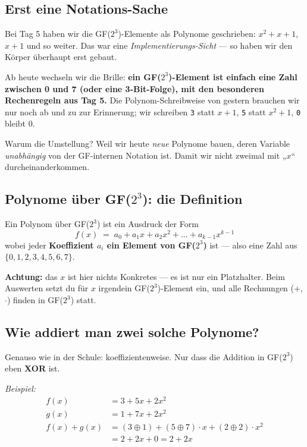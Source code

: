 \subsection*{Erst eine Notations-Sache}

Bei Tag 5 haben wir die GF($2^3$)-Elemente als Polynome geschrieben:
$x^2 + x + 1$, $x + 1$ und so weiter. Das war eine \emph{Implementierungs-Sicht}
— so haben wir den Körper überhaupt erst gebaut.

Ab heute wechseln wir die Brille: \textbf{ein GF($2^3$)-Element ist
einfach eine Zahl zwischen 0 und 7 (oder eine 3-Bit-Folge), mit den
besonderen Rechenregeln aus Tag 5.} Die Polynom-Schreibweise von
gestern brauchen wir nur noch ab und zu zur Erinnerung; wir schreiben
\texttt{3} statt $x+1$, \texttt{5} statt $x^2+1$, \texttt{0} bleibt $0$.

Warum die Umstellung? Weil wir heute \emph{neue} Polynome bauen, deren
Variable \emph{unabhängig} von der GF-internen Notation ist. Damit wir
nicht zweimal mit „$x$“ durcheinanderkommen.

\subsection*{Polynome über GF($2^3$): die Definition}

Ein Polynom über GF($2^3$) ist ein Ausdruck der Form
\[
  f(x) \;=\; a_0 + a_1 x + a_2 x^2 + \dots + a_{k-1} x^{k-1}
\]
wobei jeder \textbf{Koeffizient $a_i$ ein Element von GF($2^3$)} ist
— also eine Zahl aus $\{0, 1, 2, 3, 4, 5, 6, 7\}$.

\textbf{Achtung:} das $x$ ist hier nichts Konkretes — es ist nur ein
Platzhalter. Beim Auswerten setzt du für $x$ irgendein
GF($2^3$)-Element ein, und alle Rechnungen ($+$, $\cdot$) finden in
GF($2^3$) statt.

\subsection*{Wie addiert man zwei solche Polynome?}

Genauso wie in der Schule: koeffizientenweise. Nur dass die Addition
in GF($2^3$) eben \textbf{XOR} ist.

\textit{Beispiel:}
\begin{align*}
  f(x) &= 3 + 5x + 2x^2 \\
  g(x) &= 1 + 7x + 2x^2 \\
  f(x) + g(x) &= (3 \oplus 1) + (5 \oplus 7) \cdot x + (2 \oplus 2) \cdot x^2 \\
              &= 2 + 2x + 0 = 2 + 2x
\end{align*}

